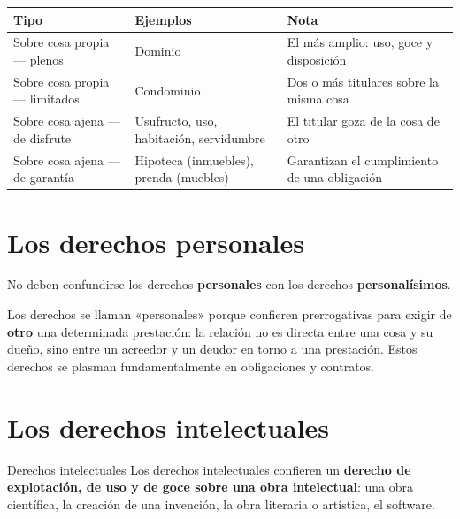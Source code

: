 \documentclass[12pt,oneside]{book}
\newenvironment{tabla}{%
    \par\medskip\begingroup\small\renewcommand{\arraystretch}{1.3}\noindent\ignorespaces
}{%
    \par\endgroup\medskip
}
\begin{document}
\begin{tabla}
\begin{tabularx}{\textwidth}{B{4.4cm}P{4.2cm}Y}
\toprule
Tipo & \textbf{Ejemplos} & \textbf{Nota} \\
\midrule
Sobre cosa propia --- plenos & Dominio & El más amplio: uso, goce y disposición \\
Sobre cosa propia --- limitados & Condominio & Dos o más titulares sobre la misma cosa \\
Sobre cosa ajena --- de disfrute & Usufructo, uso, habitación, servidumbre & El titular goza de la cosa de otro \\
Sobre cosa ajena --- de garantía & Hipoteca (inmuebles), prenda (muebles) & Garantizan el cumplimiento de una obligación \\
\bottomrule
\end{tabularx}
\end{tabla}

\section{Los derechos personales}

\begin{important}
No deben confundirse los derechos \textbf{personales} con los derechos \textbf{personalísimos}.
\end{important}

Los derechos se llaman «personales» porque confieren prerrogativas para exigir de \textbf{otro} una determinada prestación: la relación no es directa entre una cosa y su dueño, sino entre un acreedor y un deudor en torno a una prestación. Estos derechos se plasman fundamentalmente en obligaciones y contratos.

\section{Los derechos intelectuales}

\begin{definition}{Derechos intelectuales}
Los derechos intelectuales confieren un \textbf{derecho de explotación, de uso y de goce sobre una obra intelectual}: una obra científica, la creación de una invención, la obra literaria o artística, el software.
\end{definition}
\end{document}
